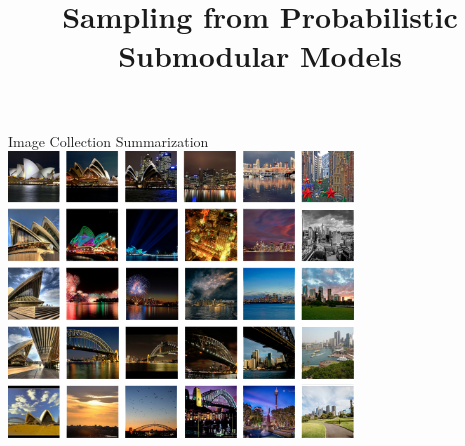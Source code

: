 \documentclass[mathserif]{beamer}
\title[Sampling from Probabilistic Submodular Models]
{Sampling from Probabilistic Submodular Models}
\author[Alkis Gotovos]{}
\begin{document}


\begin{frame}{Image Collection Summarization}
\vspace{0.5em}
\centering
\includegraphics[width=3.6in]{figures/flickr_probs_0.png}
\end{frame}
\end{document}
